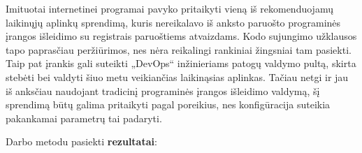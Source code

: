 \documentclass{VUMIFPSkursinis}
\begin{document}
Imituotai internetinei programai pavyko pritaikyti vieną iš rekomenduojamų laikinųjų aplinkų sprendimą, kuris nereikalavo iš anksto paruošto programinės įrangos išleidimo su registrais paruoštiems atvaizdams. Kodo sujungimo užklausos tapo paprasčiau peržiūrimos, nes nėra reikalingi rankiniai žingsniai tam pasiekti. Taip pat įrankis gali suteikti „DevOps“ inžinieriams patogų valdymo pultą, skirta stebėti bei valdyti šiuo metu veikiančias laikinąsias aplinkas. Tačiau netgi ir jau iš anksčiau naudojant tradicinį programinės įrangos išleidimo valdymą, šį sprendimą būtų galima pritaikyti pagal poreikius, nes konfigūracija suteikia pakankamai parametrų tai padaryti.


Darbo metodu pasiekti \textbf{rezultatai}:
\end{document}
